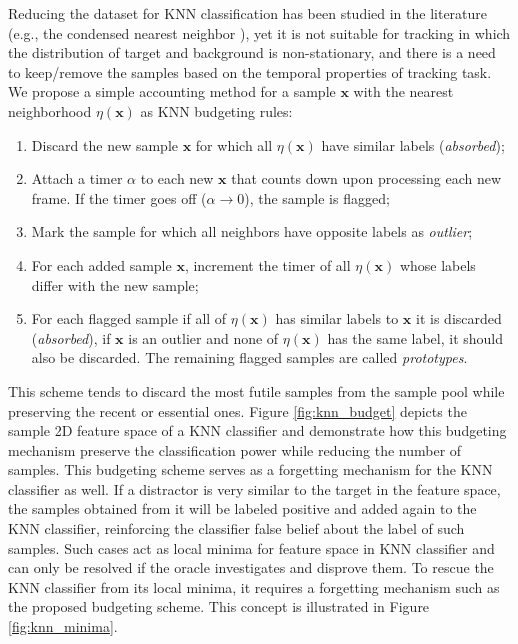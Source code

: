 \documentclass[conference,twoside]{IEEEtran}
\begin{document}
Reducing the dataset for KNN classification has been studied in the literature (e.g., the condensed nearest neighbor \cite{angiulli2005fast}), yet it is not suitable for tracking in which the distribution of target and background is non-stationary, and there is a need to keep/remove the samples based on the temporal properties of tracking task. We propose a simple accounting method for a sample $\mathbf{x}$ with the nearest neighborhood $\eta(\mathbf{x})$ as KNN budgeting rules:
\begin{enumerate}
\item Discard the new sample $\mathbf{x}$ for which all $\eta(\mathbf{x})$ have similar labels (\textit{absorbed});
\item Attach a timer $\alpha$ to each new $\mathbf{x}$ that counts down upon processing each new frame. If the timer goes off ($\alpha \rightarrow 0$), the sample is flagged;
\item Mark the sample for which all neighbors have opposite labels as \textit{outlier};
\item For each added sample $\mathbf{x}$, increment the timer of all $\eta(\mathbf{x})$ whose labels differ with the new sample;
\item For each flagged sample if all of $\eta(\mathbf{x})$ has similar labels to $\mathbf{x}$ it is discarded (\textit{absorbed}), if $\mathbf{x}$ is an outlier and none of $\eta(\mathbf{x})$ has the same label, it should also be discarded. The remaining flagged samples are called \textit{prototypes}.
\end{enumerate}
This scheme tends to discard the most futile samples from the sample pool while preserving the recent or essential ones. Figure \ref{fig:knn_budget} depicts the sample 2D feature space of a KNN classifier and demonstrate how this budgeting mechanism preserve the classification power while reducing the number of samples. 
This budgeting scheme serves as a forgetting mechanism for the KNN classifier as well. If a distractor is very similar to the target in the feature space, the samples obtained from it will be labeled positive and added again to the KNN classifier, reinforcing the classifier false belief about the label of such samples. Such cases act as local minima for feature space in KNN classifier and can only be resolved if the oracle investigates and disprove them. To rescue the KNN classifier from its local minima, it requires a forgetting mechanism such as the proposed budgeting scheme. This concept is illustrated in Figure \ref{fig:knn_minima}.
\end{document}
